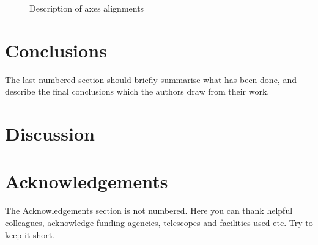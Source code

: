 \documentclass[a4paper,fleqn,usenatbib]{mnras}
\begin{document}
\begin{figure}
  \hfill
  \caption{Description of axes alignments }
  \label{fig:slices}
\end{figure}



\section{Conclusions}

The last numbered section should briefly summarise what has been done, and describe
the final conclusions which the authors draw from their work.

\section{Discussion}

\section*{Acknowledgements}



The Acknowledgements section is not numbered. Here you can thank helpful
colleagues, acknowledge funding agencies, telescopes and facilities used etc.
Try to keep it short.

\end{document}
